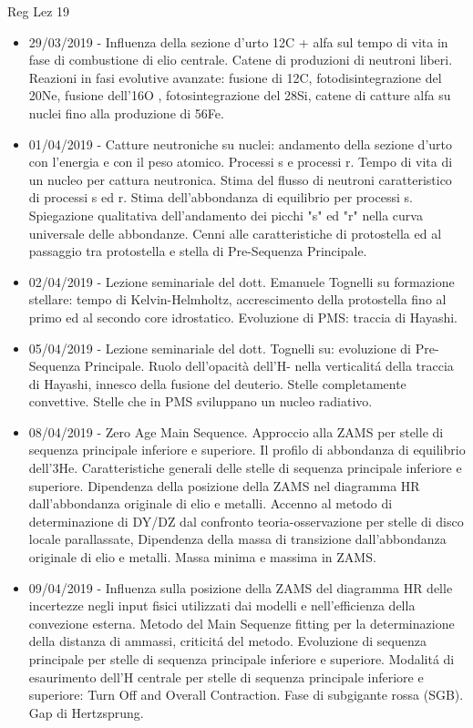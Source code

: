 \begin{frame}[allowframebreaks]{Reg Lez 19}
\begin{itemize}
\item 29/03/2019 - Influenza della sezione d'urto 12C + alfa sul tempo di vita in fase di combustione di elio centrale. Catene di produzioni di neutroni liberi. Reazioni in fasi evolutive avanzate: fusione di 12C, fotodisintegrazione del 20Ne, fusione dell'16O , fotosintegrazione del 28Si, catene di catture alfa su nuclei fino alla produzione di 56Fe.
\item 01/04/2019 - Catture neutroniche su nuclei: andamento della sezione d'urto con l'energia e con il peso atomico. Processi s e processi r. Tempo di vita di un nucleo per cattura neutronica. Stima del flusso di neutroni caratteristico di processi s ed r. Stima dell'abbondanza di equilibrio per processi s. Spiegazione qualitativa dell'andamento dei picchi "s" ed "r" nella curva universale delle abbondanze. Cenni alle caratteristiche di protostella ed al passaggio tra protostella e stella di Pre-Sequenza Principale.
\item 02/04/2019 - Lezione seminariale del dott. Emanuele Tognelli su formazione stellare: tempo di Kelvin-Helmholtz, accrescimento della protostella fino al primo ed al secondo core idrostatico. Evoluzione di PMS: traccia di Hayashi.
\item 05/04/2019 - Lezione seminariale del dott. Tognelli su: evoluzione di Pre-Sequenza Principale. Ruolo dell'opacità dell'H- nella verticalit\'a della traccia di Hayashi, innesco della fusione del deuterio. Stelle completamente convettive. Stelle che in PMS sviluppano un nucleo radiativo.
\item 08/04/2019 - Zero Age Main Sequence. Approccio alla ZAMS per stelle di sequenza principale inferiore e superiore. Il profilo di abbondanza di equilibrio dell'3He. Caratteristiche generali delle stelle di sequenza principale inferiore e superiore. Dipendenza della posizione della ZAMS nel diagramma HR dall'abbondanza originale di elio e metalli. Accenno al metodo di determinazione di DY/DZ dal confronto teoria-osservazione per stelle di disco locale parallassate, Dipendenza della massa di transizione dall'abbondanza originale di elio e metalli. Massa minima e massima in ZAMS.
\item 09/04/2019 - Influenza sulla posizione della ZAMS del diagramma HR delle incertezze negli input fisici utilizzati dai modelli e nell'efficienza della convezione esterna. Metodo del Main Sequenze fitting per la determinazione della distanza di ammassi, criticit\'a del metodo. Evoluzione di sequenza principale per stelle di sequenza principale inferiore e superiore. Modalit\'a di esaurimento dell'H centrale per stelle di sequenza principale inferiore e superiore: Turn Off and Overall Contraction. Fase di subgigante rossa (SGB). Gap di Hertzsprung.

\end{itemize}
\end{frame}
